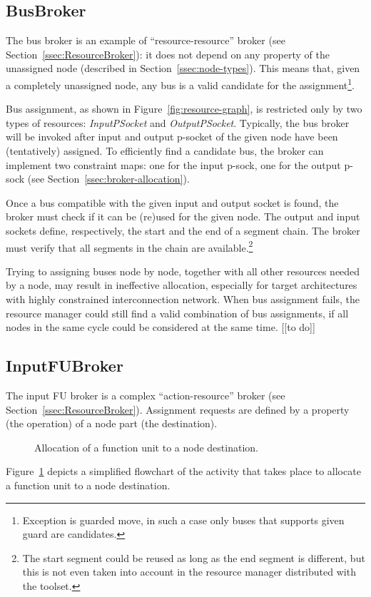 \documentclass[a4paper,twoside]{tce}
\begin{document}
\subsection{BusBroker}
\label{ssec:BusBroker-imp}

The bus broker is an example of ``resource-resource'' broker (see
Section~\ref{ssec:ResourceBroker}): it does not depend on any property of
the unassigned node (described in Section~\ref{ssec:node-types}). This means
that, given a completely unassigned node, any bus is a valid candidate for
the assignment\footnote{Exception is guarded move, in such a case only buses
that supports given guard are candidates.}.

Bus assignment, as shown in Figure~\ref{fig:resource-graph}, is restricted
only by two types of resources: \emph{InputPSocket} and
\emph{OutputPSocket}. Typically, the bus broker will be invoked after input
and output p-socket of the given node have been (tentatively) assigned. To
efficiently find a candidate bus, the broker can implement two constraint
maps: one for the input p-sock, one for the output p-sock (see
Section~\ref{ssec:broker-allocation}).

Once a bus compatible with the given input and output socket is found, the
broker must check if it can be (re)used for the given node. The output and
input sockets define, respectively, the start and the end of a segment
chain. The broker must verify that all segments in the chain are
available.\footnote{
%
  The start segment could be reused as long as the end segment is different,
  but this is not even taken into account in the resource manager
  distributed with the toolset.}

Trying to assigning buses node by node, together with all other resources
needed by a node, may result in ineffective allocation, especially for
target architectures with highly constrained interconnection network.
%
When bus assignment fails, the resource manager could still find a valid
combination of bus assignments, if all nodes in the same cycle could be
considered at the same time. [[to do]]
%

\subsection{InputFUBroker}
\label{ssec:InputFUBroker-imp}

The input FU broker is a complex ``action-resource'' broker (see
Section~\ref{ssec:ResourceBroker}). Assignment requests are defined by a
property (the operation) of a node part (the destination).
%
\begin{figure}[tb]
\centerline{}
\caption{Allocation of a function unit to a node destination.}
  \label{fig:fu-broker-flowchart}
\end{figure}
%
Figure~\ref{fig:fu-broker-flowchart} depicts a simplified flowchart of the
activity that takes place to allocate a function unit to a node destination.
\end{document}
